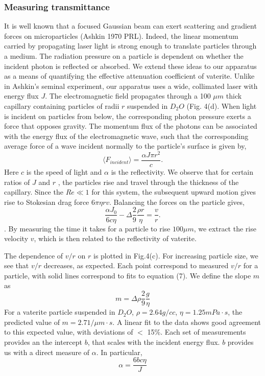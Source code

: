 \documentclass[12pt]{article}
\begin{document}
{\subsubsection*{Measuring transmittance}
	It is well known that a focused Gaussian beam can exert scattering and gradient forces on microparticles (Ashkin 1970 PRL). Indeed, the linear momentum carried by propagating laser light is strong enough to translate particles through a medium. The radiation pressure on a particle is dependent on whether the incident photon is reflected or absorbed. We extend these ideas to our apparatus as a means of quantifying the effective attenuation coefficient of vaterite. 
	Unlike in Ashkin’s seminal experiment, our apparatus uses a wide, collimated laser with energy flux $J$. The electromagnetic field propagates through a 100 $\mu m$ thick capillary containing particles of radii $r$  suspended in $D_{2}O$ (Fig. 4(d). When light is incident on particles from below, the corresponding photon pressure exerts a force that opposes gravity. The momentum flux of the photons can be associated with the energy flux of the electromagnetic wave, such that the corresponding average force of a wave incident normally to the particle's surface is given by, 
$$\langle F_{incident}\rangle=\frac{\alpha J\pi r^2}{c}.$$
Here $c$ is the speed of light and $\alpha$ is the reflectivity.
We observe that for certain ratios of $J$ and $r$ , the particles rise and travel through the thickness of the capillary. Since the $Re\ll1 $ for this system, the subsequent upward motion gives rise to Stokesian drag force $6\pi \eta rv$. Balancing the forces on the particle gives,  
\begin{equation}
\frac {\alpha J_{0} }{6c \eta}-\Delta \frac{2}{9}\frac{\rho r}{\eta} = \frac{v}{r}. 
\end{equation}.
By measuring the time it takes for a particle to rise $100 \mu m$, we extract the rise velocity $v$, which is then related to the reflectivity of vaterite.

The dependence of $v/r$ on $r$  is plotted in Fig.4(c). For increasing particle size, we see that $v/r$ decreases, as expected.  Each point correspond to measured $v/r$ for a particle, with solid lines correspond to fits to equation (7). We define the slope $m$ as $$m=\Delta\rho\frac{2}{9}\frac{g}{\eta}$$
For a vaterite particle suspended in $D_2O$, $\rho=2.64 g/cc$, $\eta=1.25mPa\cdot s$, the predicted value of $m=2.7 1/\mu m\cdot s$. A linear fit to the data shows good agreement to this expected value, with deviations of $<$ 15\%. Each set of measurements provides an the intercept $b$, that scales with the incident energy flux. $b$ provides us with a direct measure of $\alpha$. In particular,  
$$ \alpha=\frac{6bc\eta}{J}$$

}
\end{document}

